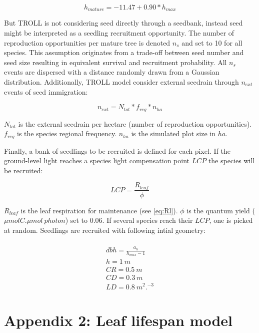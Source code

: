 \documentclass[12pt,]{article}
\let\oldsection\section
\renewcommand\section{\newpage\oldsection}
\theoremstyle{definition}
\theoremstyle{definition}
\theoremstyle{remark}
\begin{document}
\begin{equation}
  h_{mature} = -11.47+0.90*h_{max}
  \label{eq:hmature}
\end{equation}

But TROLL is not considering seed directly through a seedbank, instead
seed might be interpreted as a seedling recruitment opportunity. The
number of reproduction opportunities per mature tree is denoted \(n_s\)
and set to 10 for all species. This assumption originates from a
trade-off between seed number and seed size resulting in equivalent
survival and recruitment probability. All \(n_s\) events are dispersed
with a distance randomly drawn from a Gaussian distribution.
Additionally, TROLL model consider external seedrain through \(n_{ext}\)
events of seed immigration:

\begin{equation}
  n_{ext} = N_{tot}*f_{reg}*n_{ha}
  \label{eq:next}
\end{equation}

\(N_{tot}\) is the external seedrain per hectare (number of reproduction
opportunities). \(f_{reg}\) is the species regional frequency.
\(n_{ha}\) is the simulated plot size in \(ha\).

Finally, a bank of seedlings to be recruited is defined for each pixel.
If the ground-level light reaches a species light compensation point
\(LCP\) the species will be recruited:

\begin{equation}
  LCP = \frac{R_{leaf}}{\phi}
  \label{eq:LCP}
\end{equation}

\(R_{leaf}\) is the leaf respiration for maintenance (see \eqref{eq:Rl}).
\(\phi\) is the quantum yield (\(\mu mol C.\mu mol~photon\)) set to
0.06. If several species reach their \(LCP\), one is picked at random.
Seedlings are recruited with following intial geometry:

\begin{equation}
  \begin{array}{c} \\
    dbh = \frac{a_h}{h_{max} - 1}\\
    h = 1~m\\
    CR = 0.5~m\\
    CD = 0.3~m\\
    LD = 0.8~m^2.^{-3}
  \end{array}
  \label{eq:C}
\end{equation}

\hypertarget{appendix-2-leaf-lifespan-model}{\section{Appendix 2: Leaf
lifespan model}\label{appendix-2-leaf-lifespan-model}}
\end{document}
